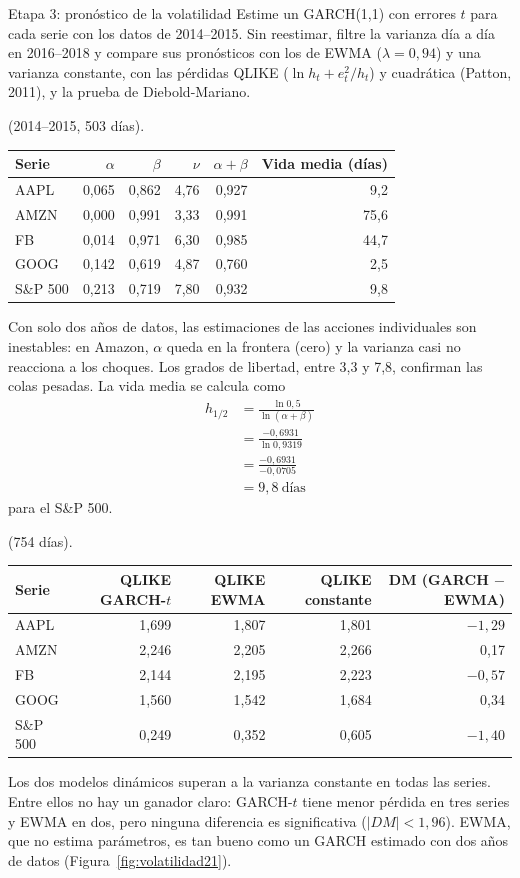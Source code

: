 \begin{ejresuelto}{Etapa 3: pronóstico de la volatilidad}\label{ej:etapa3}
\enunciado Estime un GARCH(1,1) con errores $t$ para cada serie con los datos de 2014--2015. Sin reestimar, filtre la varianza día a día en 2016--2018 y
compare sus pronósticos con los de EWMA ($\lambda=0{,}94$) y una varianza constante, con las pérdidas QLIKE ($\ln h_t+e_t^2/h_t$) y cuadrática (Patton, 2011), y la
prueba de Diebold-Mariano.

\solucion
{} (2014--2015, 503 días).
\begin{center}\small
\begin{tabular}{@{}lrrrrr@{}}
\toprule
Serie & $\alpha$ & $\beta$ & $\nu$ & $\alpha+\beta$ & Vida media (días) \\
\midrule
AAPL & 0,065 & 0,862 & 4,76 & 0,927 & 9,2 \\
AMZN & 0,000 & 0,991 & 3,33 & 0,991 & 75,6 \\
FB & 0,014 & 0,971 & 6,30 & 0,985 & 44,7 \\
GOOG & 0,142 & 0,619 & 4,87 & 0,760 & 2,5 \\
S\&P 500 & 0,213 & 0,719 & 7,80 & 0,932 & 9,8 \\
\bottomrule
\end{tabular}
\end{center}
Con solo dos años de datos, las estimaciones de las acciones individuales son inestables: en Amazon, $\alpha$ queda en la frontera (cero) y la varianza
casi no reacciona a los choques. Los grados de libertad, entre 3,3 y 7,8, confirman las colas pesadas. La vida media se calcula como
\begin{align*}
  h_{1/2} &= \frac{\ln0{,}5}{\ln(\alpha+\beta)}\\
          &= \frac{-0{,}6931}{\ln0{,}9319}\\
          &= \frac{-0{,}6931}{-0{,}0705}\\
          &= 9{,}8\ \text{días}
\end{align*}
para el S\&P 500.

 (754 días).
\begin{center}\small
\begin{tabular}{@{}lrrrr@{}}
\toprule
Serie & QLIKE GARCH-$t$ & QLIKE EWMA & QLIKE constante & DM (GARCH $-$ EWMA) \\
\midrule
AAPL & 1,699 & 1,807 & 1,801 & $-1{,}29$ \\
AMZN & 2,246 & 2,205 & 2,266 & 0,17 \\
FB & 2,144 & 2,195 & 2,223 & $-0{,}57$ \\
GOOG & 1,560 & 1,542 & 1,684 & 0,34 \\
S\&P 500 & 0,249 & 0,352 & 0,605 & $-1{,}40$ \\
\bottomrule
\end{tabular}
\end{center}
Los dos modelos dinámicos superan a la varianza constante en todas las series. Entre ellos no hay un ganador claro: GARCH-$t$ tiene menor pérdida en tres
series y EWMA en dos, pero ninguna diferencia es significativa ($|DM|<1{,}96$). EWMA, que no estima parámetros, es tan bueno como un GARCH estimado con
dos años de datos (Figura~\ref{fig:volatilidad21}).


\end{ejresuelto}
